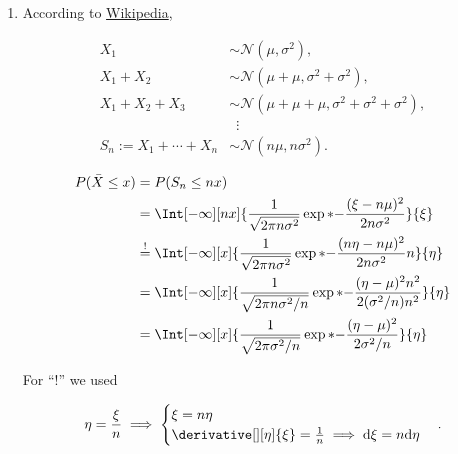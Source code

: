 \begin{solution}
\begin{enumerate}[label = (\alph*)]
        \item According to \href{https://en.wikipedia.org/wiki/Sum_of_normally_distributed_random_variables#:~:text=This%20means%20that%20the%20sum,squares%20of%20the%20standard%20deviations}{Wikipedia},

        \begin{align*}
            X_1                       & \sim \mathcal N(\mu, \sigma^2), \\
            X_1 + X_2                 & \sim \mathcal N(\mu + \mu, \sigma^2 + \sigma^2), \\
            X_1 + X_2 + X_3           & \sim \mathcal N(\mu + \mu + \mu, \sigma^2 + \sigma^2 + \sigma^2), \\
                                      & \, \, \, \vdots \\
            S_n := X_1 + \cdots + X_n & \sim \mathcal N(n \mu, n \sigma^2).
        \end{align*}

        \begin{align*}
            P(\bar X \leq x)
            & =
            P(S_n \leq n x) \\
            & =
            \Int[-\infty][n x]
            {
                \frac{1}{\sqrt{2 \pi n \sigma^2}}
                \exp*
                {
                    -\frac{(\xi - n \mu)^2}{2 n \sigma^2}
                }
            }{\xi} \\
            & \stackrel{!}{=}
            \Int[-\infty][x]
            {
                \frac{1}{\sqrt{2 \pi n \sigma^2}}
                \exp*
                {
                    -\frac{(n \eta - n \mu)^2}{2 n \sigma^2}
                }
                n
            }{\eta} \\
            & =
            \Int[-\infty][x]
            {
                \frac{1}{\sqrt{2 \pi n \sigma^2 / n}}
                \exp*
                {
                    -\frac{(\eta - \mu)^2 n^2}{2 (\sigma^2 / n) n^2}
                }
            }{\eta} \\
            & =
            \Int[-\infty][x]
            {
                \frac{1}{\sqrt{2 \pi \sigma^2 / n}}
                \exp*
                {
                    -\frac{(\eta - \mu)^2}{2 \sigma^2 / n}
                }
            }{\eta}
        \end{align*}

        For \enquote{!} we used

        \begin{align*}
            \eta = \frac{\xi}{n}
            \implies
            \begin{cases}
                \xi = n \eta \\
                \derivative[][\eta]{\xi} = \frac{1}{n} \implies \mathrm d \xi = n \mathrm d \eta
            \end{cases}.
        \end{align*}

\end{enumerate}

\end{solution}

